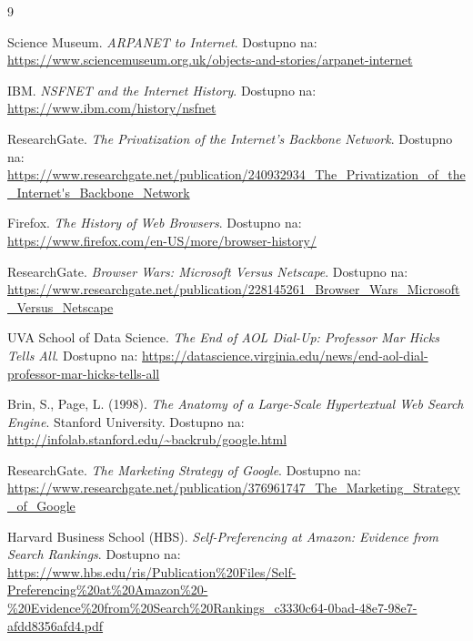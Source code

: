 \documentclass[12pt,a4paper]{article}
\begin{document}
\begin{thebibliography}{9}

Science Museum. \textit{ARPANET to Internet}.
Dostupno na: \url{https://www.sciencemuseum.org.uk/objects-and-stories/arpanet-internet}

IBM. \textit{NSFNET and the Internet History}.
Dostupno na: \url{https://www.ibm.com/history/nsfnet}

ResearchGate. \textit{The Privatization of the Internet's Backbone Network}.
Dostupno na: \url{https://www.researchgate.net/publication/240932934_The_Privatization_of_the_Internet's_Backbone_Network}

Firefox. \textit{The History of Web Browsers}.
Dostupno na: \url{https://www.firefox.com/en-US/more/browser-history/}

ResearchGate. \textit{Browser Wars: Microsoft Versus Netscape}.
Dostupno na: \url{https://www.researchgate.net/publication/228145261_Browser_Wars_Microsoft_Versus_Netscape}

UVA School of Data Science. \textit{The End of AOL Dial-Up: Professor Mar Hicks Tells All}.
Dostupno na: \url{https://datascience.virginia.edu/news/end-aol-dial-professor-mar-hicks-tells-all}

Brin, S., Page, L. (1998). \textit{The Anatomy of a Large-Scale Hypertextual Web Search Engine}. Stanford University. 
Dostupno na: \url{http://infolab.stanford.edu/~backrub/google.html}

ResearchGate. \textit{The Marketing Strategy of Google}.
Dostupno na: \url{https://www.researchgate.net/publication/376961747_The_Marketing_Strategy_of_Google}

Harvard Business School (HBS). \textit{Self-Preferencing at Amazon: Evidence from Search Rankings}.
Dostupno na: \url{https://www.hbs.edu/ris/Publication%20Files/Self-Preferencing%20at%20Amazon%20-%20Evidence%20from%20Search%20Rankings_c3330c64-0bad-48e7-98e7-afdd8356afd4.pdf}

\end{thebibliography}
\end{document}
